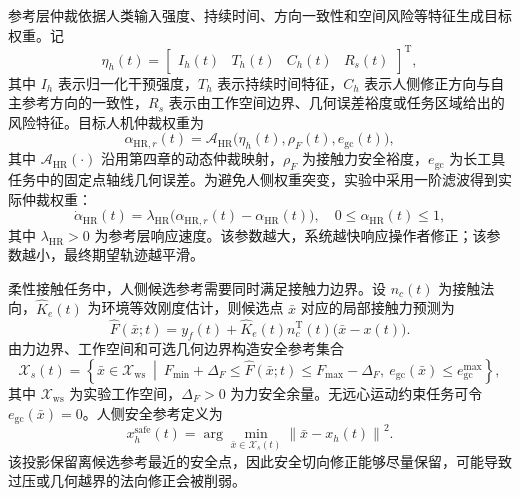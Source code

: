 参考层仲裁依据人类输入强度、持续时间、方向一致性和空间风险等特征生成目标权重。记
\begin{equation}
  \eta_h(t)=
  \begin{bmatrix}
    I_h(t) & T_h(t) & C_h(t) & R_s(t)
  \end{bmatrix}^{\mathrm T},
  \label{eq:ch5_human_feature_vector}
\end{equation}
其中 $I_h$ 表示归一化干预强度，$T_h$ 表示持续时间特征，$C_h$ 表示人侧修正方向与自主参考方向的一致性，$R_s$ 表示由工作空间边界、几何误差裕度或任务区域给出的风险特征。目标人机仲裁权重为
\begin{equation}
  \alpha_{\mathrm{HR},r}(t)=
  \mathcal A_{\mathrm{HR}}\bigl(\eta_h(t),\rho_F(t),e_{\mathrm{gc}}(t)\bigr),
  \label{eq:ch5_alpha_hr_map}
\end{equation}
其中 $\mathcal A_{\mathrm{HR}}(\cdot)$ 沿用第四章的动态仲裁映射，$\rho_F$ 为接触力安全裕度，$e_{\mathrm{gc}}$ 为长工具任务中的固定点轴线几何误差。为避免人侧权重突变，实验中采用一阶滤波得到实际仲裁权重：
\begin{equation}
  \dot{\alpha}_{\mathrm{HR}}(t)=
  \lambda_{\mathrm{HR}}
  \bigl(\alpha_{\mathrm{HR},r}(t)-\alpha_{\mathrm{HR}}(t)\bigr),
  \quad
  0\le \alpha_{\mathrm{HR}}(t)\le 1,
  \label{eq:ch5_alpha_hr_filter_model}
\end{equation}
其中 $\lambda_{\mathrm{HR}}>0$ 为参考层响应速度。该参数越大，系统越快响应操作者修正；该参数越小，最终期望轨迹越平滑。

柔性接触任务中，人侧候选参考需要同时满足接触力边界。设 $n_c(t)$ 为接触法向，$\hat K_e(t)$ 为环境等效刚度估计，则候选点 $\bar x$ 对应的局部接触力预测为
\begin{equation}
  \hat F(\bar x;t)=
  y_f(t)+\hat K_e(t)n_c^{\mathrm T}(t)\bigl(\bar x-x(t)\bigr).
  \label{eq:ch5_force_prediction_model}
\end{equation}
由力边界、工作空间和可选几何边界构造安全参考集合
\begin{equation}
  \mathcal X_s(t)=
  \left\{
  \bar x\in\mathcal X_{\mathrm{ws}}
  \ \middle|\
  F_{\min}+\Delta_F\le \hat F(\bar x;t)\le F_{\max}-\Delta_F,\
  e_{\mathrm{gc}}(\bar x)\le e_{\mathrm{gc}}^{\max}
  \right\},
  \label{eq:ch5_safe_reference_set}
\end{equation}
其中 $\mathcal X_{\mathrm{ws}}$ 为实验工作空间，$\Delta_F>0$ 为力安全余量。无远心运动约束任务可令 $e_{\mathrm{gc}}(\bar x)=0$。人侧安全参考定义为
\begin{equation}
  x_h^{\mathrm{safe}}(t)=
  \arg\min_{\bar x\in\mathcal X_s(t)}
  \left\|\bar x-x_h(t)\right\|^2.
  \label{eq:ch5_safe_projection_model}
\end{equation}
该投影保留离候选参考最近的安全点，因此安全切向修正能够尽量保留，可能导致过压或几何越界的法向修正会被削弱。

